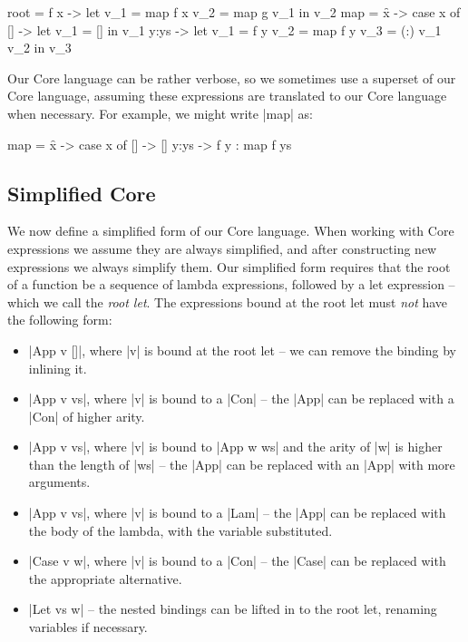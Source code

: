 \documentclass[draft]{sigplanconf}
\begin{document}
\begin{code}
root = \g f x ->  let  v_1 =  map f x
                       v_2 =  map g v_1
                  in   v_2
map = \f x -> case  x of
                    []    ->   let  v_1 = []
                               in   v_1
                    y:ys  ->   let  v_1 = f y
                                    v_2 = map f y
                                    v_3 = (:) v_1 v_2
                               in   v_3
\end{code}

Our Core language can be rather verbose, so we sometimes use a superset of our Core language, assuming these expressions are translated to our Core language when necessary. For example, we might write |map| as:

\begin{code}
map = \f x -> case  x of
                    []    -> []
                    y:ys  -> f y : map f ys
\end{code}

\subsection{Simplified Core}
\label{sec:simplify}

We now define a simplified form of our Core language. When working with Core expressions we assume they are always simplified, and after constructing new expressions we always simplify them. Our simplified form requires that the root of a function be a sequence of lambda expressions, followed by a let expression -- which we call the \textit{root let}. The expressions bound at the root let must \textit{not} have the following form:

\begin{itemize}
\item |App v []|, where |v| is bound at the root let -- we can remove the binding by inlining it.
\item |App v vs|, where |v| is bound to a |Con| -- the |App| can be replaced with a |Con| of higher arity.
\item |App v vs|, where |v| is bound to |App w ws| and the arity of |w| is higher than the length of |ws| -- the |App| can be replaced with an |App| with more arguments.
\item |App v vs|, where |v| is bound to a |Lam| -- the |App| can be replaced with the body of the lambda, with the variable substituted.
\item |Case v w|, where |v| is bound to a |Con| -- the |Case| can be replaced with the appropriate alternative.
\item |Let vs w| -- the nested bindings can be lifted in to the root let, renaming variables if necessary.
\end{itemize}
\end{document}
